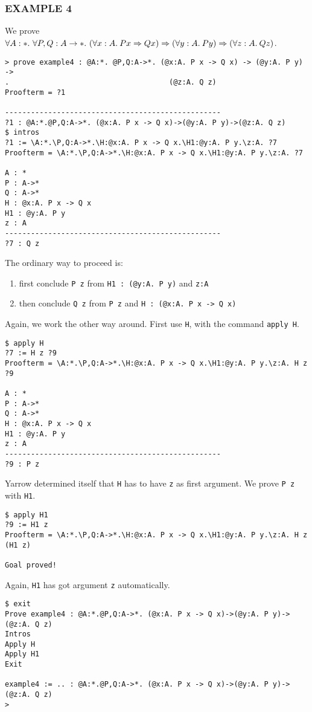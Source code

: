 \subsubsection*{EXAMPLE 4}
We prove
$\forall A:\st.\
  \forall P,Q:A\rightarrow\st.\
  (\forall x:A.\:P x\Rightarrow Q x) \Rightarrow (\forall y:A.\:P y) \Rightarrow (\forall z:A.\:Q z)
$.
\begin{verbatim}
> prove example4 : @A:*. @P,Q:A->*. (@x:A. P x -> Q x) -> (@y:A. P y) ->
.                                     (@z:A. Q z)
Proofterm = ?1

--------------------------------------------------
?1 : @A:*.@P,Q:A->*. (@x:A. P x -> Q x)->(@y:A. P y)->(@z:A. Q z)
$ intros
?1 := \A:*.\P,Q:A->*.\H:@x:A. P x -> Q x.\H1:@y:A. P y.\z:A. ?7
Proofterm = \A:*.\P,Q:A->*.\H:@x:A. P x -> Q x.\H1:@y:A. P y.\z:A. ?7

A : *
P : A->*
Q : A->*
H : @x:A. P x -> Q x
H1 : @y:A. P y
z : A
--------------------------------------------------
?7 : Q z
\end{verbatim}
The ordinary way to proceed is:
\begin{enumerate}
\item
first conclude
{\tt P z}
from
{\tt H1 : (@y:A. P y)}
and
{\tt z:A}
\item
then conclude
{\tt Q z} from {\tt P z} and {\tt H : (@x:A. P x -> Q x)}
\end{enumerate}
Again, we work the other way around.
First use {\tt H},
with the command {\tt apply H}.
\begin{verbatim}
$ apply H
?7 := H z ?9
Proofterm = \A:*.\P,Q:A->*.\H:@x:A. P x -> Q x.\H1:@y:A. P y.\z:A. H z ?9

A : *
P : A->*
Q : A->*
H : @x:A. P x -> Q x
H1 : @y:A. P y
z : A
--------------------------------------------------
?9 : P z
\end{verbatim}
Yarrow determined itself that {\tt H} has to have {\tt z} as first argument.
We prove {\tt P z} with {\tt H1}.
\begin{verbatim}
$ apply H1
?9 := H1 z
Proofterm = \A:*.\P,Q:A->*.\H:@x:A. P x -> Q x.\H1:@y:A. P y.\z:A. H z (H1 z)

Goal proved!
\end{verbatim}
Again, {\tt H1} has got argument {\tt z} automatically.
\begin{verbatim}
$ exit
Prove example4 : @A:*.@P,Q:A->*. (@x:A. P x -> Q x)->(@y:A. P y)->(@z:A. Q z)
Intros
Apply H
Apply H1
Exit

example4 := .. : @A:*.@P,Q:A->*. (@x:A. P x -> Q x)->(@y:A. P y)->(@z:A. Q z)
>
\end{verbatim}



